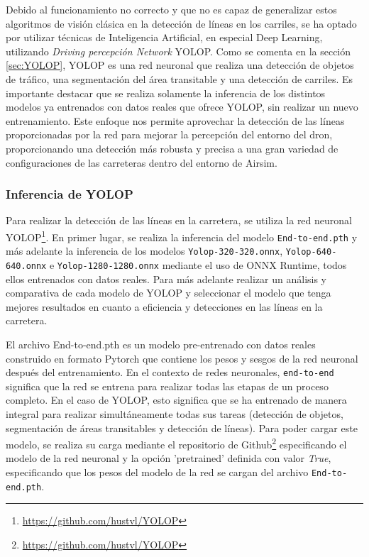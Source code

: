 Debido al funcionamiento no correcto y que no es capaz de generalizar estos algoritmos de visión clásica en la detección de líneas en los carriles, se 
ha optado por utilizar técnicas de Inteligencia Artificial, en especial Deep Learning, utilizando \textit{Driving percepción Network} YOLOP. Como se comenta en la sección \ref{sec:YOLOP}, 
YOLOP es una red neuronal que realiza una detección de objetos de tráfico, una segmentación del área transitable y una detección de carriles. Es importante 
destacar que se realiza solamente la inferencia de los distintos modelos ya entrenados con datos reales que ofrece YOLOP, sin realizar un nuevo entrenamiento. Este enfoque nos permite aprovechar 
la detección de las líneas proporcionadas por la red para mejorar la percepción del entorno del dron, proporcionando una detección más robusta y precisa a una gran variedad de configuraciones
de las carreteras dentro del entorno de Airsim. 

\subsubsection{Inferencia de YOLOP}
\label{sec:Inferencia de YOLOP}

Para realizar la detección de las líneas en la carretera, se utiliza la red neuronal YOLOP\footnote{\url{https://github.com/hustvl/YOLOP}}. En primer lugar, 
se realiza la inferencia del modelo \texttt{End-to-end.pth} y más adelante la inferencia de los modelos \texttt{Yolop-320-320.onnx}, \texttt{Yolop-640-640.onnx} e 
\texttt{Yolop-1280-1280.onnx} mediante el uso de ONNX Runtime, todos ellos entrenados con datos reales. Para más adelante realizar un análisis y comparativa de cada modelo de YOLOP y seleccionar
el modelo que tenga mejores resultados en cuanto a eficiencia y detecciones en las líneas en la carretera.

El archivo End-to-end.pth es un modelo pre-entrenado con datos reales construido en formato Pytorch que contiene los pesos y sesgos de la red neuronal después del entrenamiento. En el contexto de 
redes neuronales, \texttt{end-to-end} significa que la red se entrena para realizar todas las etapas de un proceso completo. En el caso de YOLOP, esto significa que se ha entrenado de manera integral 
para realizar simultáneamente todas sus tareas (detección de objetos, segmentación de áreas transitables y detección de líneas). Para poder cargar este modelo, se realiza 
su carga mediante el repositorio de Github\footnote{\url{https://github.com/hustvl/YOLOP}}
especificando el modelo de la red neuronal y la opción 'pretrained' definida con valor \textit{True}, especificando que los pesos del modelo de la red se cargan del archivo 
\texttt{End-to-end.pth}.

